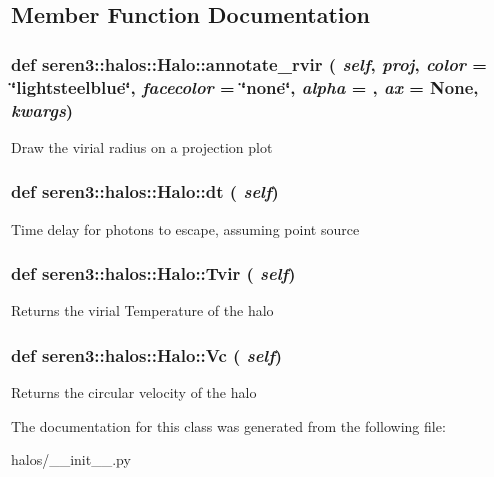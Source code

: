 \subsection{Member Function Documentation}
\hypertarget{classseren3_1_1halos_1_1Halo_a968e5dfbe7df6dd1b86cfc8759989429}{
\subsubsection[{annotate\_\-rvir}]{\setlength{\rightskip}{0pt plus 5cm}def seren3::halos::Halo::annotate\_\-rvir ( {\em self}, \/   {\em proj}, \/   {\em color} = {\ttfamily \char`\"{}lightsteelblue\char`\"{}}, \/   {\em facecolor} = {\ttfamily \char`\"{}none\char`\"{}}, \/   {\em alpha} = {}, \/   {\em ax} = {\ttfamily None}, \/   {\em kwargs})}}
\label{classseren3_1_1halos_1_1Halo_a968e5dfbe7df6dd1b86cfc8759989429}
\begin{DoxyVerb}
Draw the virial radius on a projection plot
\end{DoxyVerb}
 \hypertarget{classseren3_1_1halos_1_1Halo_ac4d698a3806a71f152cf55408b8cc7be}{
\subsubsection[{dt}]{\setlength{\rightskip}{0pt plus 5cm}def seren3::halos::Halo::dt ( {\em self})}}
\label{classseren3_1_1halos_1_1Halo_ac4d698a3806a71f152cf55408b8cc7be}
\begin{DoxyVerb}
Time delay for photons to escape, assuming point source
\end{DoxyVerb}
 \hypertarget{classseren3_1_1halos_1_1Halo_ab424a563b7ca0f0cef9dc5d54fe8c894}{
\subsubsection[{Tvir}]{\setlength{\rightskip}{0pt plus 5cm}def seren3::halos::Halo::Tvir ( {\em self})}}
\label{classseren3_1_1halos_1_1Halo_ab424a563b7ca0f0cef9dc5d54fe8c894}
\begin{DoxyVerb}
Returns the virial Temperature of the halo
\end{DoxyVerb}
 \hypertarget{classseren3_1_1halos_1_1Halo_a110253908b47cf70fb156ab0eb602135}{
\subsubsection[{Vc}]{\setlength{\rightskip}{0pt plus 5cm}def seren3::halos::Halo::Vc ( {\em self})}}
\label{classseren3_1_1halos_1_1Halo_a110253908b47cf70fb156ab0eb602135}
\begin{DoxyVerb}
Returns the circular velocity of the halo
\end{DoxyVerb}
 

The documentation for this class was generated from the following file:\begin{DoxyCompactItemize}
\item 
halos/\_\-\_\-init\_\-\_\-.py\end{DoxyCompactItemize}
